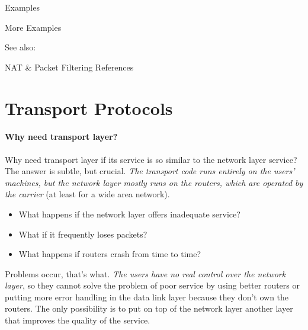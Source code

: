 \begin{frame}{Examples}
  \begin{center}
  \end{center}
\end{frame}

\begin{frame}{More Examples}
  \begin{center}
  \end{center}
\end{frame}

See also: 

\begin{frame}{NAT \& Packet Filtering References}
  \begin{refsection}
    \nocite{wiki:nat, rfc1631, web:nat, wiki:iptables,}
    \printbibliography[heading=none]
  \end{refsection}
\end{frame}

\section{Transport Protocols}

\paragraph{Why need transport layer?}

  Why need transport layer if its service is so similar to the network layer service? The
  answer is subtle, but crucial. \emph{The transport code runs entirely on the users' machines,
  but the network layer mostly runs on the routers, which are operated by the carrier} (at
  least for a wide area network). 
  \begin{itemize}
  \item What happens if the network layer offers inadequate service?
  \item What if it frequently loses packets?
  \item What happens if routers crash from time to time?
  \end{itemize}
  Problems occur, that's what. \emph{The users have no real control over the network layer}, so
  they cannot solve the problem of poor service by using better routers or putting more
  error handling in the data link layer because they don't own the routers. The only
  possibility is to put on top of the network layer another layer that improves the
  quality of the service.

